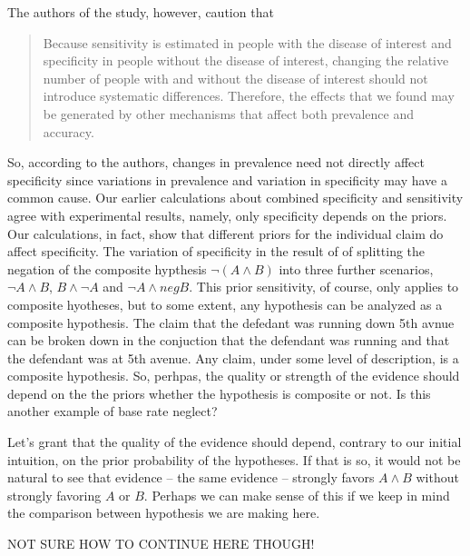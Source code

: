 \documentclass[10pt,dvipsnames,enabledeprecatedfontcommands]{scrartcl}
\begin{document}
\noindent
The authors of the study, however, caution that

\begin{quote}
 Because sensitivity is estimated in
people with the disease of interest and specificity
in people without the disease of interest, changing the relative number of people 
with and without the disease of interest should not introduce
systematic differences. Therefore, the effects that
we found may be generated by other mechanisms that affect 
both prevalence and accuracy.
\end{quote}

So, according to the authors, changes in prevalence need not directly
affect specificity since variations in prevalence and variation in
specificity may have a common cause. Our earlier calculations about
combined specificity and sensitivity agree with experimental results,
namely, only specificity depends on the priors. Our calculations, in
fact, show that different priors for the individual claim do affect
specificity. The variation of specificity in the result of of splitting
the negation of the composite hypthesis \(\neg (A \wedge B)\) into three
further scenarios, \(\neg A \wedge B\), \(B \wedge \neg A\) and
\(\neg A \wedge neg B\). This prior sensitivity, of course, only applies
to composite hyotheses, but to some extent, any hypothesis can be
analyzed as a composite hypothesis. The claim that the defedant was
running down 5th avnue can be broken down in the conjuction that the
defendant was running and that the defendant was at 5th avenue. Any
claim, under some level of description, is a composite hypothesis. So,
perhpas, the quality or strength of the evidence should depend on the
the priors whether the hypothesis is composite or not. Is this another
example of base rate neglect?

Let's grant that the quality of the evidence should depend, contrary to
our initial intuition, on the prior probability of the hypotheses. If
that is so, it would not be natural to see that evidence -- the same
evidence -- strongly favors \(A\wedge B\) without strongly favoring
\(A\) or \(B\). Perhaps we can make sense of this if we keep in mind the
comparison between hypothesis we are making here.

NOT SURE HOW TO CONTINUE HERE THOUGH!
\end{document}
